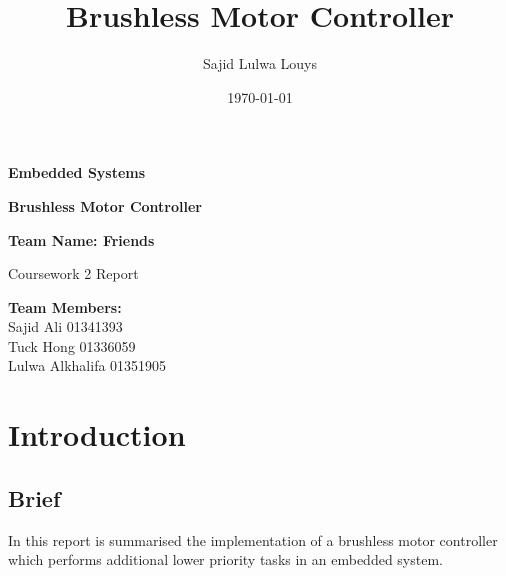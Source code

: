 \documentclass{article}
\title{Brushless Motor Controller}
\author{Sajid Lulwa Louys}
\date{\today}
\begin{document}
\begin{titlepage}
    \begin{center}
        \vspace*{1cm}

        \Huge
        \textbf{Embedded Systems}

        \vspace{0.5cm}
        \LARGE
        \textbf{Brushless Motor Controller}

        \vspace{1.5cm}

        \textbf{Team Name: Friends}\\

        \vfill

        Coursework 2 Report\\


        \vspace{0.8cm}


        \Large
        \textbf{Team Members:}\\
        Sajid Ali 01341393\\
        Tuck Hong 01336059\\
        Lulwa Alkhalifa 01351905 \\

    \end{center}
\end{titlepage}


\tableofcontents
\thispagestyle{empty} %
\clearpage

\setcounter{page}{1}

\section{Introduction}
\subsection{Brief}
In this report is summarised the implementation of a brushless motor controller which performs additional lower priority tasks in an embedded system.
\end{document}
